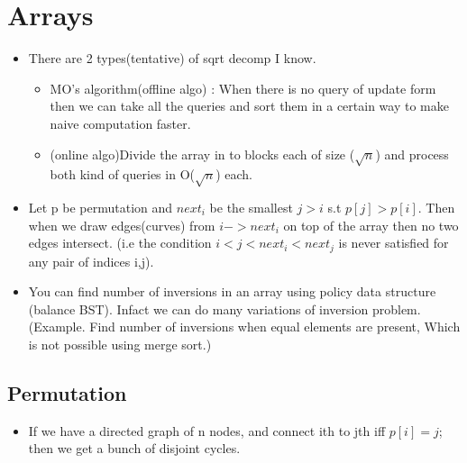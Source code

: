 \documentclass[../Notes.tex]{subfiles}
\begin{document}
\chapter{Arrays}

\begin{itemize}
	\item There are 2 types(tentative) of sqrt decomp I know.
	\begin{itemize}
		\item MO's algorithm(offline algo) : When there is no query of update form then we can take all the queries and sort them in a certain way to make naive computation faster.
		\item (online algo)Divide the array in to blocks each of size ($\sqrt{n}$) and process both kind of queries in O($\sqrt{n}$) each.
	\end{itemize} 
	\item Let p be permutation and $next_{i}$ be the smallest $j>i$ s.t $p[j]>p[i]$. Then when we draw edges(curves) from $i -> next_{i}$ on top of the array then no two edges intersect. (i.e the condition $i<j<next_{i}<next_{j}$ is never satisfied for any pair of indices i,j).
	\item You can find number of inversions in an array using policy data structure (balance BST). Infact we can do many variations of inversion problem. (Example. Find number of inversions when equal elements are present, Which is not possible using merge sort.) 
\end{itemize}


\section{Permutation}
\begin{itemize}
	\item If we have a directed graph of n nodes, and connect ith to jth iff $p[i]=j$; then we get a bunch of disjoint cycles.
\end{itemize}
\end{document}
